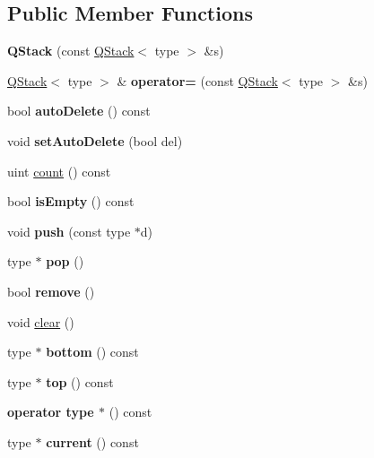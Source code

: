 \subsection*{Public Member Functions}
\begin{DoxyCompactItemize}
\item 
\mbox{\label{class_q_stack_a7da26d860d102eff183135d3fa599870}} 
{\bfseries Q\+Stack} (const \mbox{\hyperlink{class_q_stack}{Q\+Stack}}$<$ type $>$ \&s)
\item 
\mbox{\label{class_q_stack_a87144ce6ce778c8d76363d68b6129d62}} 
\mbox{\hyperlink{class_q_stack}{Q\+Stack}}$<$ type $>$ \& {\bfseries operator=} (const \mbox{\hyperlink{class_q_stack}{Q\+Stack}}$<$ type $>$ \&s)
\item 
\mbox{\label{class_q_stack_a4c764d883f551fe2d1ebbaa7b58e7b54}} 
bool {\bfseries auto\+Delete} () const
\item 
\mbox{\label{class_q_stack_a55152b44c464b3a9c8104f6173b7cc4f}} 
void {\bfseries set\+Auto\+Delete} (bool del)
\item 
uint \mbox{\hyperlink{class_q_stack_a39f4fccb4ce975b29f5ed06b78316c24}{count}} () const
\item 
\mbox{\label{class_q_stack_a2b27bd5722d6b56d14343d93ed142db9}} 
bool {\bfseries is\+Empty} () const
\item 
\mbox{\label{class_q_stack_ad21cdb38c5b76acfd3a534fd2a77b478}} 
void {\bfseries push} (const type $\ast$d)
\item 
\mbox{\label{class_q_stack_a9e5fca8d076435018fbe07efa38f14a2}} 
type $\ast$ {\bfseries pop} ()
\item 
\mbox{\label{class_q_stack_a74f126d3f9e6ae6f472ebf5d445633e2}} 
bool {\bfseries remove} ()
\item 
void \mbox{\hyperlink{class_q_stack_a07ac0d10d6912270790d0c1a82ee2715}{clear}} ()
\item 
\mbox{\label{class_q_stack_aa736ac6ceca8bfbc73ddb967accfdf37}} 
type $\ast$ {\bfseries bottom} () const
\item 
\mbox{\label{class_q_stack_aea7c34d0dbde5dbd136660ea9f20bb92}} 
type $\ast$ {\bfseries top} () const
\item 
\mbox{\label{class_q_stack_aad864e9760d80296b3ff297a2c706a51}} 
{\bfseries operator type $\ast$} () const
\item 
\mbox{\label{class_q_stack_a94485de1fde26c1dc26fa50aa6cf7c13}} 
type $\ast$ {\bfseries current} () const
\end{DoxyCompactItemize}


